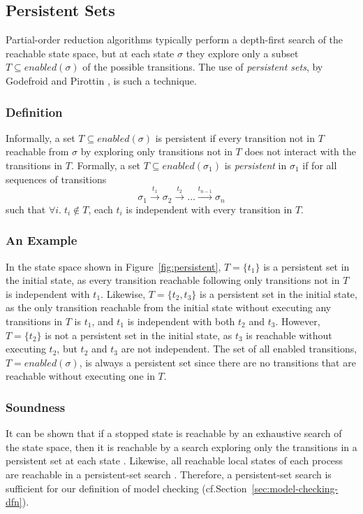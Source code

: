\documentclass[12pt,a4paper,twoside,openany]{report}
\begin{document}
\subsection{Persistent Sets}
\label{sec:persistent}

Partial-order reduction algorithms typically 
perform a depth-first
search of the reachable state space, but at each
state $\sigma$ they explore only a subset
$T \subseteq \textit{enabled}(\sigma)$
of the possible transitions.
The use of \textit{persistent sets},
by Godefroid and Pirottin \cite{god93},
is such a technique.

\subsubsection{Definition}

Informally,
a set $T \subseteq \textit{enabled}(\sigma)$
is persistent if every
transition not in $T$ reachable
from $\sigma$ by exploring only transitions not in
$T$ does not interact with the transitions
in $T$. Formally, a set
$T \subseteq \textit{enabled}(\sigma_1)$
is \emph{persistent} in $\sigma_1$ if
for all sequences of transitions
\[
	\sigma_1 \xrightarrow{\ t_1\ } \sigma_2 \xrightarrow{\ t_2\ } \ldots
	\xrightarrow{t_{n-1}} \sigma_n
\]
such that $\forall i.\; t_i \not \in T$,
each $t_i$ is
independent with every transition in $T$.

\subsubsection{An Example}
In the state space shown in
Figure~\ref{fig:persistent}, $T = \{t_1\}$ is
a persistent set in the initial state, as every
transition reachable following only transitions
not in $T$ is independent with $t_1$.
Likewise, $T = \{t_2, t_3\}$ is
a persistent set in the initial state, as the
only transition reachable from the initial state
without executing any transitions in $T$ is $t_1$,
and $t_1$ is independent with both $t_2$ and $t_3$.
However, $T = \{t_2\}$ is not a persistent set in the
initial state, as $t_3$ is reachable without
executing $t_2$, but $t_2$ and $t_3$ are not independent.
The set of all enabled transitions,
$T = \textit{enabled}(\sigma)$, is always a
persistent set since there are no transitions
that are reachable without executing one in $T$.

\subsubsection{Soundness}
It can be shown that if a stopped
state is reachable by an exhaustive
search of the state space, then
it is reachable by a search exploring
only the transitions in a persistent set
at each state \cite[Theorem~4.3]{god96}.
Likewise, all reachable
local states of each process are reachable
in a persistent-set search
\cite[Theorem~6.14]{god96}.
Therefore,
a persistent-set search is sufficient for
our definition of model checking
(cf.\@ Section~\ref{sec:model-checking-dfn}).
\end{document}
